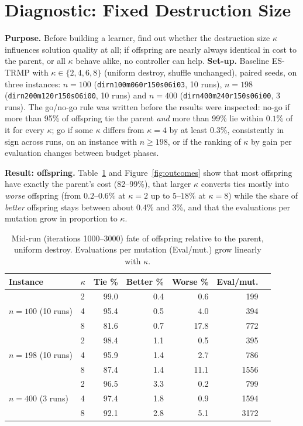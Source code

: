 
\section{Diagnostic: Fixed Destruction Size}\label{sec:exp-diag}

\textbf{Purpose.} Before building a learner, find out whether the destruction size $\kappa$ influences solution quality at all; if offspring are nearly always identical in cost to the parent, or all $\kappa$ behave alike, no controller can help. \textbf{Set-up.} Baseline ES-TRMP with $\kappa\in\{2,4,6,8\}$ (uniform destroy, shuffle unchanged), paired seeds, on three instances: $n=100$ (\texttt{dirn100m060r150s06i03}, 10 runs), $n=198$ (\texttt{dirn200m120r150s06i00}, 10 runs) and $n=400$ (\texttt{dirn400m240r150s06i00}, 3 runs). The go/no-go rule was written before the results were inspected: no-go if more than 95\% of offspring tie the parent \emph{and} more than 99\% lie within $0.1\%$ of it for every $\kappa$; go if some $\kappa$ differs from $\kappa=4$ by at least $0.3\%$, consistently in sign across runs, on an instance with $n\ge198$, or if the ranking of $\kappa$ by gain per evaluation changes between budget phases.

\textbf{Result: offspring.} Table~\ref{tab:diag} and Figure~\ref{fig:outcomes} show that most offspring have exactly the parent's cost (82--99\%), that larger $\kappa$ converts ties mostly into \emph{worse} offspring (from $0.2$--$0.6\%$ at $\kappa=2$ up to $5$--$18\%$ at $\kappa=8$) while the share of \emph{better} offspring stays between about 0.4\% and 3\%, and that the evaluations per mutation grow in proportion to $\kappa$.

\begin{table}[htbp]
\centering
\caption{Mid-run (iterations 1000--3000) fate of offspring relative to the parent, uniform destroy. Evaluations per mutation (Eval/mut.) grow linearly with $\kappa$.}
\label{tab:diag}
\small
\begin{tabular}{llrrrrr}
\toprule
\textbf{Instance} & $\kappa$ & \textbf{Tie \%} & \textbf{Better \%} & \textbf{Worse \%} & \textbf{Eval/mut.}\\
\midrule
\multirow{3}{*}{$n=100$ (10 runs)} & 2 & 99.0 & 0.4 & 0.6 & 199\\
 & 4 & 95.4 & 0.5 & 4.0 & 394\\
 & 8 & 81.6 & 0.7 & 17.8 & 772\\
\midrule
\multirow{3}{*}{$n=198$ (10 runs)} & 2 & 98.4 & 1.1 & 0.5 & 395\\
 & 4 & 95.9 & 1.4 & 2.7 & 786\\
 & 8 & 87.4 & 1.4 & 11.1 & 1556\\
\midrule
\multirow{3}{*}{$n=400$ (3 runs)} & 2 & 96.5 & 3.3 & 0.2 & 799\\
 & 4 & 97.4 & 1.8 & 0.9 & 1594\\
 & 8 & 92.1 & 2.8 & 5.1 & 3172\\
\bottomrule
\end{tabular}
\end{table}

